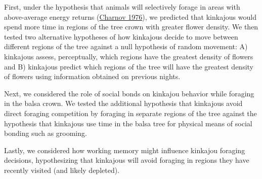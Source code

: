 \documentclass[twoside,12pt,final]{ucthesis-CA2012}
\begin{document}
\begin{ucmainmatter}
First, under the hypothesis that animals will selectively forage in areas with above-average energy returns (\protect\hyperlink{ref-charnov1976}{Charnov 1976}), we predicted that kinkajous would spend more time in regions of the tree crown with greater flower density. We then tested two alternative hypotheses of how kinkajous decide to move between different regions of the tree against a null hypothesis of random movement: A) kinkajous assess, perceptually, which regions have the greatest density of flowers and B) kinkajous predict which regions of the tree will have the greatest density of flowers using information obtained on previous nights.

Next, we considered the role of social bonds on kinkajou behavior while foraging in the balsa crown. We tested the additional hypothesis that kinkajous avoid direct foraging competition by foraging in separate regions of the tree against the hypothesis that kinkajous use time in the balsa tree for physical means of social bonding such as grooming.

Lastly, we considered how working memory might influence kinkajou foraging decisions, hypothesizing that kinkajous will avoid foraging in regions they have recently visited (and likely depleted).
\begin{table}


\end{table}
\end{ucmainmatter}
\end{document}
